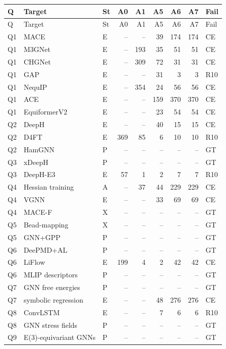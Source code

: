 \documentclass[11pt,a4paper]{article}
\begin{document}
\begin{longtable}{p{0.7cm}p{3.9cm}p{0.5cm}rrrrrp{0.85cm}}
\toprule
Q & Target & St & A0 & A1 & A5 & A6 & A7 & Fail \\
\midrule
\endfirsthead
\toprule
Q & Target & St & A0 & A1 & A5 & A6 & A7 & Fail \\
\midrule
\endhead
\bottomrule
\endfoot
Q1 & MACE & E & -- & -- & 39 & 174 & 174 & CE \\
Q1 & M3GNet & E & -- & 193 & 35 & 51 & 51 & CE \\
Q1 & CHGNet & E & -- & 309 & 72 & 31 & 31 & CE \\
Q1 & GAP & E & -- & -- & 31 & 3 & 3 & R10 \\
Q1 & NequIP & E & -- & 354 & 24 & 56 & 56 & CE \\
Q1 & ACE & E & -- & -- & 159 & 370 & 370 & CE \\
Q1 & EquiformerV2 & E & -- & -- & 23 & 54 & 54 & CE \\
Q2 & DeepH & E & -- & -- & 40 & 15 & 15 & CE \\
Q2 & D4FT & E & 369 & 85 & 6 & 10 & 10 & R10 \\
Q2 & HamGNN & P & -- & -- & -- & -- & -- & GT \\
Q3 & xDeepH & P & -- & -- & -- & -- & -- & GT \\
Q3 & DeepH-E3 & E & 57 & 1 & 2 & 7 & 7 & R10 \\
Q4 & Hessian training & A & -- & 37 & 44 & 229 & 229 & CE \\
Q4 & VGNN & E & -- & -- & 33 & 69 & 69 & CE \\
Q4 & MACE-F & X & -- & -- & -- & -- & -- & GT \\
Q5 & Bead-mapping & X & -- & -- & -- & -- & -- & GT \\
Q5 & GNN+GPP & P & -- & -- & -- & -- & -- & GT \\
Q6 & DeePMD+AL & P & -- & -- & -- & -- & -- & GT \\
Q6 & LiFlow & E & 199 & 4 & 2 & 42 & 42 & CE \\
Q6 & MLIP descriptors & P & -- & -- & -- & -- & -- & GT \\
Q7 & GNN free energies & P & -- & -- & -- & -- & -- & GT \\
Q7 & symbolic regression & E & -- & -- & 48 & 276 & 276 & CE \\
Q8 & ConvLSTM & E & -- & -- & 7 & 6 & 6 & R10 \\
Q8 & GNN stress fields & P & -- & -- & -- & -- & -- & GT \\
Q9 & E(3)-equivariant GNNs & P & -- & -- & -- & -- & -- & GT \\

\end{longtable}
\end{document}
